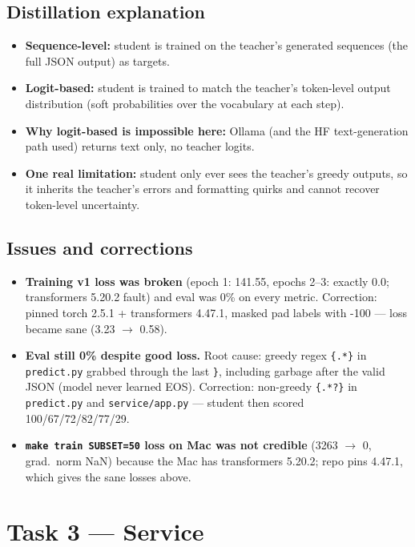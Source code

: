 \documentclass[11pt,a4paper]{article}
\begin{document}
\subsection*{Distillation explanation}
\begin{itemize}
\item \textbf{Sequence-level:} student is trained on the teacher's generated sequences (the full JSON output) as targets.
\item \textbf{Logit-based:} student is trained to match the teacher's token-level output distribution (soft probabilities over the vocabulary at each step).
\item \textbf{Why logit-based is impossible here:} Ollama (and the HF text-generation path used) returns text only, no teacher logits.
\item \textbf{One real limitation:} student only ever sees the teacher's greedy outputs, so it inherits the teacher's errors and formatting quirks and cannot recover token-level uncertainty.
\end{itemize}
\subsection*{Issues and corrections}
\begin{itemize}
\item \textbf{Training v1 loss was broken} (epoch 1: 141.55, epochs 2--3: exactly 0.0; transformers 5.20.2 fault) and eval was 0\% on every metric. Correction: pinned torch 2.5.1 + transformers 4.47.1, masked pad labels with -100 --- loss became sane (3.23 $\to$ 0.58).
\item \textbf{Eval still 0\% despite good loss.} Root cause: greedy regex \texttt{\{.*\}} in \texttt{predict.py} grabbed through the last \texttt{\}}, including garbage after the valid JSON (model never learned EOS). Correction: non-greedy \texttt{\{.*?\}} in \texttt{predict.py} and \texttt{service/app.py} --- student then scored 100/67/72/82/77/29.
\item \textbf{\texttt{make train SUBSET=50} loss on Mac was not credible} (3263 $\to$ 0, grad.\ norm NaN) because the Mac has transformers 5.20.2; repo pins 4.47.1, which gives the sane losses above.
\end{itemize}

\section{Task 3 --- Service}
\end{document}
